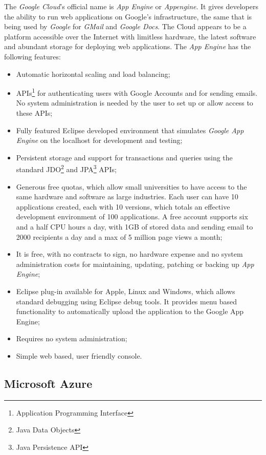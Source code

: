 The \textit{Google Cloud}'s official name is \textit{App Engine} or \textit{Appengine}. It gives developers the ability to run web applications on Google's infrastructure, the same that is being used by \textit{Google} for \textit{GMail} and \textit{Google Docs}.
The Cloud appears to be a platform accessible over the Internet with limitless hardware, the latest software and abundant storage for deploying web applications.
The \textit{App Engine} has the following features:
\begin{itemize}
\item Automatic horizontal scaling and load balancing;
\item APIs\footnote{Application Programming Interface} for authenticating users with Google Accounts and for sending emails. No system administration is needed by the user to set up or allow access to these APIs;
\item Fully featured Eclipse developed environment that simulates \textit{Google App Engine} on the localhost for development and testing;
\item Persistent storage and support for transactions and queries using the standard JDO\footnote{Java Data Objects} and JPA\footnote{Java Persistence API} APIs;
\item Generous free quotas, which allow small universities to have access to the same hardware and software as large industries. Each user can have 10 applications created, each with 10 versions, which totals an effective development environment of 100 applications. A free account supports six and a half CPU hours a day, with 1GB of stored data and sending email to 2000 recipients a day and a max of 5 million page views a month;
\item It is free, with no contracts to sign, no hardware expense and no system administration costs for maintaining, updating, patching or backing up \textit{App Engine};
\item Eclipse plug-in available for Apple, Linux and Windows, which allows standard debugging using Eclipse debug tools. It provides menu based functionality to automatically upload the application to the Google App Engine;
\item Requires no system administration;
\item Simple web based, user friendly console.\cite{googleapp}
\end{itemize}

\subsection{Microsoft Azure}\label{azure}

